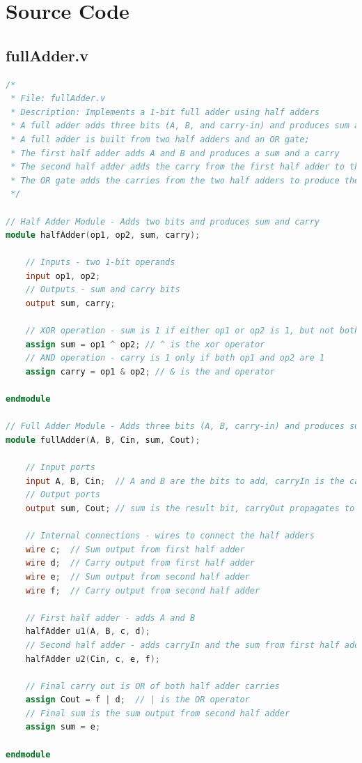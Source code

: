 \documentclass[a4paper,12pt]{article}
\begin{document}
\section*{Source Code}
\subsection*{fullAdder.v}
\begin{lstlisting}[language=Verilog]
/*
 * File: fullAdder.v
 * Description: Implements a 1-bit full adder using half adders
 * A full adder adds three bits (A, B, and carry-in) and produces sum and carry-out
 * A full adder is built from two half adders and an OR gate; 
 * The first half adder adds A and B and produces a sum and a carry
 * The second half adder adds the carry from the first half adder to the carry-in
 * The OR gate adds the carries from the two half adders to produce the final carry-out
 */

// Half Adder Module - Adds two bits and produces sum and carry
module halfAdder(op1, op2, sum, carry);

    // Inputs - two 1-bit operands
    input op1, op2;
    // Outputs - sum and carry bits
    output sum, carry;
    
    // XOR operation - sum is 1 if either op1 or op2 is 1, but not both
    assign sum = op1 ^ op2; // ^ is the xor operator
    // AND operation - carry is 1 only if both op1 and op2 are 1
    assign carry = op1 & op2; // & is the and operator
    
endmodule

// Full Adder Module - Adds three bits (A, B, carry-in) and produces sum and carry-out
module fullAdder(A, B, Cin, sum, Cout);

    // Input ports
    input A, B, Cin;  // A and B are the bits to add, carryIn is the carry from previous addition
    // Output ports
    output sum, Cout; // sum is the result bit, carryOut propagates to next addition
    
    // Internal connections - wires to connect the half adders
    wire c;  // Sum output from first half adder
    wire d;  // Carry output from first half adder
    wire e;  // Sum output from second half adder
    wire f;  // Carry output from second half adder
    
    // First half adder - adds A and B
    halfAdder u1(A, B, c, d);
    // Second half adder - adds carryIn and the sum from first half adder
    halfAdder u2(Cin, c, e, f);
    
    // Final carry out is OR of both half adder carries
    assign Cout = f | d;  // | is the OR operator
    // Final sum is the sum output from second half adder
    assign sum = e;
    
endmodule
\end{lstlisting}
\end{document}
